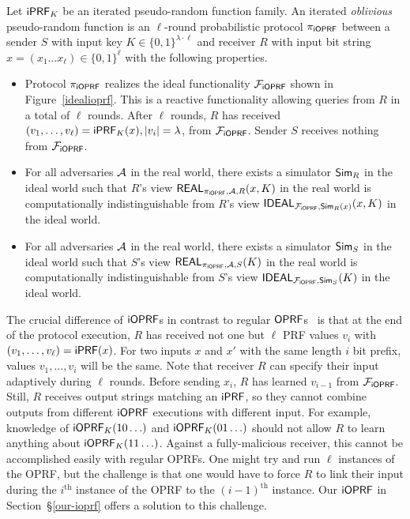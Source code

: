 \begin{definition}[$\proto$]
  Let $\mathsf{i}\mathsf{PRF}_K$ be an iterated pseudo-random function family.  An
  iterated \emph{oblivious} pseudo-random function is an $\ell$-round
  probabilistic protocol $\proto$ between a sender $S$ with input key
  $K\in\{0,1\}^{\lambda\cdot\ell}$ and receiver $R$ with input bit
  string $x=(x_1\ldots{}x_\ell)\in\{0,1\}^{\ell}$ with the following
  properties.

  \begin{itemize}
   
  \item Protocol $\proto$ realizes the ideal functionality $\mathcal{F}_{\mathsf{i}\mathsf{OPRF}}$
    shown in Figure~\ref{idealioprf}. This is a reactive functionality
    allowing queries from $R$ in a total of $\ell$ rounds.  After
    $\ell$ rounds, $R$ has received
    $(v_1,\ldots,v_\ell)=\mathsf{i}\mathsf{PRF}_K(x),|v_i|=\lambda$, from
    $\mathcal{F}_{\mathsf{i}\mathsf{OPRF}}$. Sender $S$ receives nothing from $\mathcal{F}_{\mathsf{i}\mathsf{OPRF}}$.
  
  \item For all adversaries ${\mathcal{A}}$ in the real world, there exists a
    simulator ${\mathsf{Sim}}_R$ in the ideal world such that $R$'s view
    $\mathsf{REAL}_{{\pi_{\mathsf{i}\mathsf{OPRF}}},{\mathcal{A}},R}(x,K)$ in the real world is
    computationally indistinguishable from $R$'s view
    $\mathsf{IDEAL}_{\mathcal{F}_{\mathsf{i}\mathsf{OPRF}},{\mathsf{Sim}}_R(x)}(x,K)$ in the ideal world.

  \item For all adversaries ${\mathcal{A}}$ in the real world, there exists a
    simulator ${\mathsf{Sim}}_S$ in the ideal world such that $S$'s view
    $\mathsf{REAL}_{{\pi_{\mathsf{i}\mathsf{OPRF}}},{\mathcal{A}},S}(K)$ in the real world is
    computationally indistinguishable from $S$'s view
    $\mathsf{IDEAL}_{\mathcal{F}_{\mathsf{i}\mathsf{OPRF}},{\mathsf{Sim}}_S}(K)$ in the ideal world.
\end{itemize}
\end{definition}

The crucial difference of $\mathsf{i}\mathsf{OPRF}$s in contrast to regular
$\mathsf{OPRF}$s~\cite{oprf,stan,chase,koles,boneh,kia} is that at the end of
the protocol execution, $R$ has received not one but $\ell$ PRF values
$v_i$ with $(v_1,\ldots,v_\ell)=\mathsf{i}\mathsf{PRF}(x)$. For two inputs $x$ and $x'$
with the same length $i$ bit prefix, values $v_1,\ldots,v_i$ will be
the same. Note that receiver $R$ can specify their input adaptively
during $\ell$ rounds. Before sending $x_i$, $R$ has learned $v_{i-1}$
from $\mathcal{F}_{\mathsf{i}\mathsf{OPRF}}$. Still, $R$ receives output strings matching an
$\mathsf{i}\mathsf{PRF}$, so they cannot combine outputs from different $\mathsf{i}\mathsf{OPRF}$
executions with different input. For example, knowledge of
$\mathsf{i}\mathsf{OPRF}_K(10\ldots)$ and $\mathsf{i}\mathsf{OPRF}_K(01\ldots)$ should not allow $R$ to
learn anything about $\mathsf{i}\mathsf{OPRF}_K(11\ldots)$.  Against a fully-malicious
receiver, this cannot be accomplished easily with regular OPRFs.  One
might try and run $\ell$ instances of the OPRF, but the challenge is
that one would have to force $R$ to link their input during the
$i^\text{th}$ instance of the OPRF to the $(i-1)^\text{th}$ instance.
Our $\mathsf{i}\mathsf{OPRF}$ in Section~\S\ref{our-ioprf} offers a solution to this
challenge.

